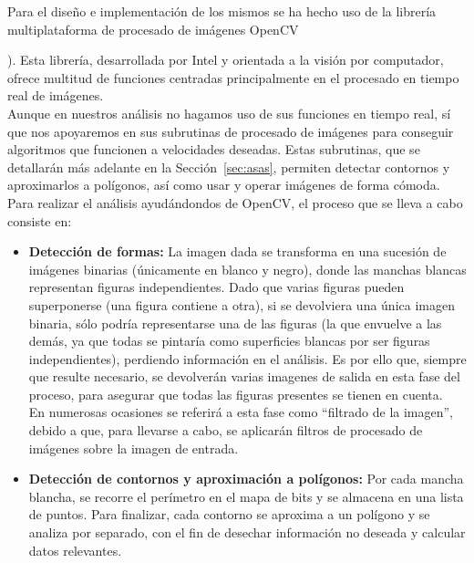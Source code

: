 Para el diseño e implementación de los mismos se ha hecho uso de la librería multiplataforma de procesado de imágenes OpenCV {\cite{opencvDoc}). Esta librería, desarrollada por Intel y orientada a la visión por computador, ofrece multitud de funciones centradas principalmente en el procesado en tiempo real de imágenes.\\

Aunque en nuestros análisis no hagamos uso de sus funciones en tiempo real, sí que nos apoyaremos en sus subrutinas de procesado de imágenes para conseguir algoritmos que funcionen a velocidades deseadas. Estas subrutinas, que se detallarán más adelante en la Sección~\ref{sec:asas}, permiten detectar contornos y aproximarlos a polígonos, así como usar y operar imágenes de forma cómoda.\\

Para realizar el análisis ayudándondos de OpenCV, el proceso que se lleva a cabo consiste en:

\begin{itemize}

	\item \textbf{Detección de formas:} La imagen dada se transforma en una sucesión de imágenes binarias (únicamente en blanco y negro), donde las manchas blancas representan figuras independientes. Dado que varias figuras pueden superponerse (una figura contiene a otra), si se devolviera una única imagen binaria, sólo podría representarse una de las figuras (la que envuelve a las demás, ya que todas se pintaría como superficies blancas por ser figuras independientes), perdiendo información en el análisis. Es por ello que, siempre que resulte necesario, se devolverán varias imagenes de salida en esta fase del proceso, para asegurar que todas las figuras presentes se tienen en cuenta.\\
	
	En numerosas ocasiones se referirá a esta fase como ``filtrado de la imagen'', debido a que, para llevarse a cabo, se aplicarán filtros de procesado de imágenes sobre la imagen de entrada.
	
	\item\textbf{Detección de contornos y aproximación a polígonos:} Por cada mancha blancha, se recorre el perímetro en el mapa de bits y se almacena en una lista de puntos. Para finalizar, cada contorno se aproxima a un polígono y se analiza por separado, con el fin de desechar información no deseada y calcular datos relevantes. 
	
\end{itemize}

}
